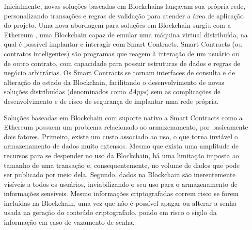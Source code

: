 \documentclass[a4paper,11pt]{article}
\begin{document}

Inicialmente, novas soluções baseadas em Blockchains lançavam sua própria rede, personalizando transações e regras de validação para atender a área de aplicação do projeto.
Uma nova abordagem para soluções em Blockchain surgiu com a Ethereum \cite{Wood2017}, uma Blockchain capaz de emular uma máquina virtual distribuída, na qual é possível implantar e interagir com Smart Contracts.
Smart Contracts (ou contratos inteligentes) são programas que reagem à interação de um usuário ou de outro contrato, com capacidade para possuir estruturas de dados e regras de negócio arbitrárias.
Os Smart Contracts se tornam interfaces de consulta e de alteração do estado da Blockchain, facilitando o desenvolvimento de novas soluções distribuídas (denominados como \emph{dApps}) sem as complicações de desenvolvimento e de risco de segurança de implantar uma rede própria.



Soluções baseadas em Blockchain com suporte nativo a Smart Contracts como a Ethereum possuem um problema relacionado ao armazenamento, por basicamente dois fatores.
Primeiro, existe um custo associado ao uso, o que torna inviável o armazenamento de dados muito extensos.
Mesmo que exista uma amplitude de recursos para se despender no uso da Blockchain, há uma limitação imposta ao tamanho de uma transação e, consequentemente, no volume de dados que pode ser publicado por meio dela.
Segundo, dados na Blockchain são inerentemente visíveis a todos os usuários, inviabilizando o seu uso para o armazenamento de informações sensíveis.
Mesmo informações criptografadas correm risco se forem incluídas na Blockchain, uma vez que não é possível apagar ou alterar a senha usada na geração do conteúdo criptografado, pondo em risco o sigilo da informação em caso de vazamento de senha.

\end{document}
